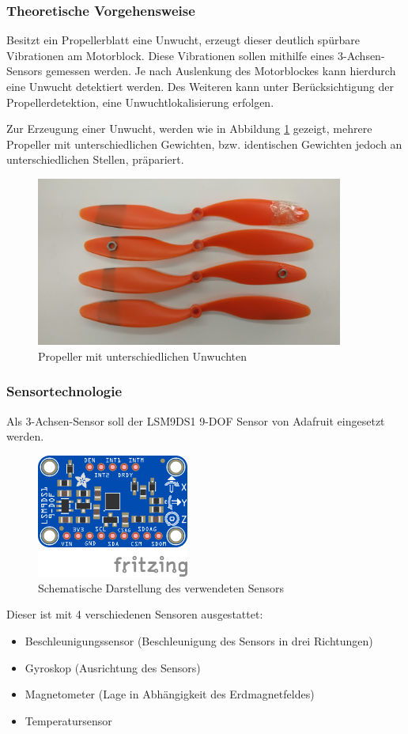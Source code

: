 \subsubsection*{Theoretische Vorgehensweise}
Besitzt ein Propellerblatt eine Unwucht, erzeugt dieser deutlich spürbare Vibrationen am Motorblock.
Diese Vibrationen sollen mithilfe eines 3-Achsen-Sensors gemessen werden.
Je nach Auslenkung des Motorblockes kann hierdurch eine Unwucht detektiert werden.
Des Weiteren kann unter Berücksichtigung der Propellerdetektion, eine Unwuchtlokalisierung erfolgen. 

Zur Erzeugung einer Unwucht, werden wie in Abbildung \ref{fig:propeller-mit-unwucht} gezeigt, mehrere Propeller mit unterschiedlichen Gewichten, bzw. identischen Gewichten jedoch an unterschiedlichen Stellen, präpariert.
\begin{figure}[H]
	\centering
	\includegraphics[width=0.9\textwidth]{images/chapter/03/propeller-mit-unwucht.png}
	\caption{Propeller mit unterschiedlichen Unwuchten}
	\label{fig:propeller-mit-unwucht}
\end{figure}

\subsubsection*{Sensortechnologie}
Als 3-Achsen-Sensor soll der LSM9DS1 9-DOF Sensor von Adafruit eingesetzt werden.
\begin{figure}[H]
	\centering
	\includegraphics[width=5cm]{images/chapter/03/9-dof.png}
	\caption{Schematische Darstellung des verwendeten Sensors}
\end{figure}
Dieser ist mit 4 verschiedenen Sensoren ausgestattet:
\begin{itemize}
	\item Beschleunigungssensor (Beschleunigung des Sensors in drei Richtungen)
	\item Gyroskop (Ausrichtung des Sensors)
	\item Magnetometer (Lage in Abhängigkeit des Erdmagnetfeldes)
	\item Temperatursensor
\end{itemize}

